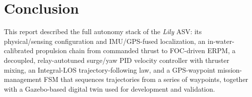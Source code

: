 \section*{Conclusion}

This report described the full autonomy stack of the \textit{Lily} ASV: its physical/sensing configuration and IMU/GPS-fused localization, an in-water-calibrated propulsion chain from commanded thrust to FOC-driven ERPM, a decoupled, relay-autotuned surge/yaw PID velocity controller with thruster mixing, an Integral-LOS trajectory-following law, and a GPS-waypoint mission-management FSM that sequences trajectories from a series of waypoints, together with a Gazebo-based digital twin used for development and validation. 
